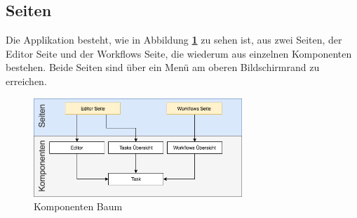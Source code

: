         \subsection{Seiten}
        
        Die Applikation besteht, wie in Abbildung \textbf{\ref{fig:Pages}} zu sehen ist, aus zwei Seiten, der Editor Seite und der Workflows Seite, die wiederum aus einzelnen Komponenten bestehen. Beide Seiten sind über ein Menü am oberen Bildschirmrand zu erreichen.
        
        \begin{figure}[h]
        \centering
        \includegraphics[width=0.7\textwidth]{images/ui_component_tree.png}
        \caption{Komponenten Baum}
        \label{fig:Pages}
        \end{figure}
        
